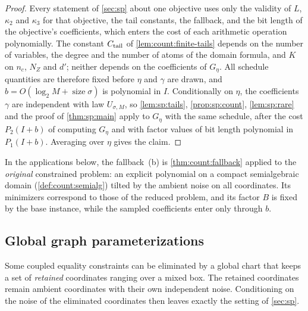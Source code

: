 \begin{proof}
Every statement of \cref{sec:sp} about one objective uses only the validity
of $L$, $\kappa_2$ and $\kappa_3$ for that objective, the tail constants,
the fallback, and the bit length of the objective's coefficients, which
enters the cost of each arithmetic operation polynomially. The constant
$C_{\rm tail}$ of \cref{lem:count:finite-tails} depends on the number of
variables, the degree and the number of atoms of the domain formula, and
$K$ on $n_c$, $N_Z$ and $d'$; neither depends on the coefficients of
$G_\eta$. All schedule quantities are therefore fixed before $\eta$ and
$\gamma$ are drawn, and $b=O(\log_2M+\operatorname{size}\sigma)$ is
polynomial in $I$. Conditionally on $\eta$, the coefficients $\gamma$ are
independent with law $U_{\sigma,M}$, so \cref{lem:sp:tails},
\cref{prop:sp:count}, \cref{lem:sp:rare} and the proof of \cref{thm:sp:main}
apply to $G_\eta$ with the same schedule, after the cost $P_2(I+b)$ of
computing $G_\eta$ and with factor values of bit length polynomial in
$P_1(I+b)$. Averaging over $\eta$ gives the claim.
\end{proof}

In the applications below, the fallback~(b) is \cref{thm:count:fallback}
applied to the \emph{original} constrained problem: an explicit polynomial
on a compact semialgebraic domain (\cref{def:count:semialg}) tilted by the
ambient noise on all coordinates. Its minimizers correspond to those of the
reduced problem, and its factor $B$ is fixed by the base instance, while the
sampled coefficients enter only through $b$.

\subsection{Global graph parameterizations}\label{sec:con:graph}

Some coupled equality constraints can be eliminated by a global chart that
keeps a set of \emph{retained} coordinates ranging over a mixed box. The
retained coordinates remain ambient coordinates with their own independent
noise. Conditioning on the noise of the eliminated coordinates then leaves
exactly the setting of \cref{sec:sp}.

